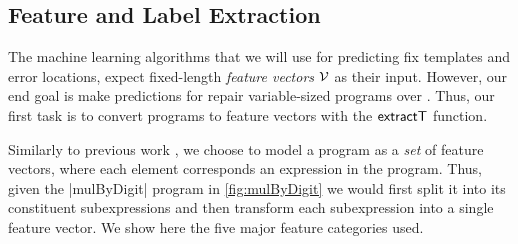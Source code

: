 



\subsection{Feature and Label Extraction}
\label{subsec:extract}
The machine learning algorithms that we will use for predicting fix templates
and error locations, expect fixed-length \emph{feature vectors} $\mathcal{V}$ as their
input. However, our end goal is make predictions for repair variable-sized
programs over \lang. Thus, our first task is to convert programs to feature
vectors with the $\mathsf{extractT}$ function.

Similarly to previous work \citep{Seidel:2017}, we choose to model a program as
a \emph{set} of feature vectors, where each element corresponds an expression in
the program. Thus, given the |mulByDigit| program in \autoref{fig:mulByDigit} we
would first split it into its constituent subexpressions and then transform each
subexpression into a single feature vector. We show here the five major feature
categories used.

